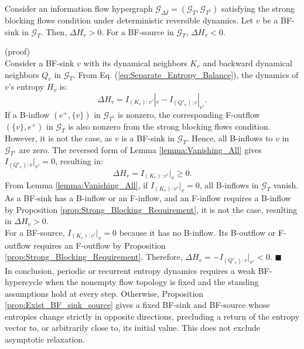 \documentclass{comnet}%
\begin{document}
\begin{proposition}
 Consider an information flow hypergraph $\mathcal{G}_{\Delta I} = (\mathcal{G}_{T}, \mathcal{G}_{T^{\dagger}})$ satisfying the strong blocking flows condition under deterministic reversible dynamics. Let $v$ be a BF-sink in $\mathcal{G}_{T}$. Then, $\Delta H_v>0$. For a BF-source in $\mathcal{G}_{T}$, $\Delta H_v<0$.
 \label{prop:Monotonic_Behavior}\end{proposition}
(proof)\\
Consider a BF-sink $v$ with its dynamical neighbors $K_v$ and backward dynamical neighbors $Q_v$ in $\mathcal G_T$. From Eq. (\ref{eq:Separate_Entropy_Balance}), the dynamics of $v$'s entropy $H_v$ is:
\begin{equation}
 \Delta H_v=I_{(K_v):v'}|_v-I_{(Q'_v):v}|_{v'}.
\end{equation}
If a B-inflow $(e^+,\{v\})$ in $\mathcal G_{T^{\dagger}}$ is nonzero, the corresponding F-outflow $(\{v\},e^+)$ in $\mathcal G_T$ is also nonzero from the strong blocking flows condition. However, it is not the case, as $v$ is a BF-sink in $\mathcal G_T$. Hence, all B-inflows to $v$ in $\mathcal G_{T^{\dagger}}$ are zero. The reversed form of Lemma \ref{lemma:Vanishing_All} gives $I_{(Q'_v):v}|_{v'}=0$, resulting in:
\begin{equation}
 \Delta H_v=I_{(K_v):v'}|_v\geqslant 0.
\end{equation}
From Lemma \ref{lemma:Vanishing_All}, if $I_{(K_v):v'}|_v=0$, all B-inflows in $\mathcal G_T$ vanish. As a BF-sink has a B-inflow or an F-inflow, and an F-inflow requires a B-inflow by Proposition \ref{prop:Strong_Blocking_Requirement}, it is not the case, resulting in $\Delta H_v>0$.\\
For a BF-source, $I_{(K_v):v'}|_v=0$ because it has no B-inflow. Its B-outflow or F-outflow requires an F-outflow by Proposition \ref{prop:Strong_Blocking_Requirement}. Therefore, $\Delta H_v=-I_{(Q'_v):v}|_{v'}<0$. $\blacksquare$\\

In conclusion, periodic or recurrent entropy dynamics requires a weak BF-hypercycle when the nonempty flow topology is fixed and the standing assumptions hold at every step. Otherwise, Proposition \ref{prop:Exist_BF_sink_source} gives a fixed BF-sink and BF-source whose entropies change strictly in opposite directions, precluding a return of the entropy vector to, or arbitrarily close to, its initial value. This does not exclude asymptotic relaxation.\\
\end{document}
